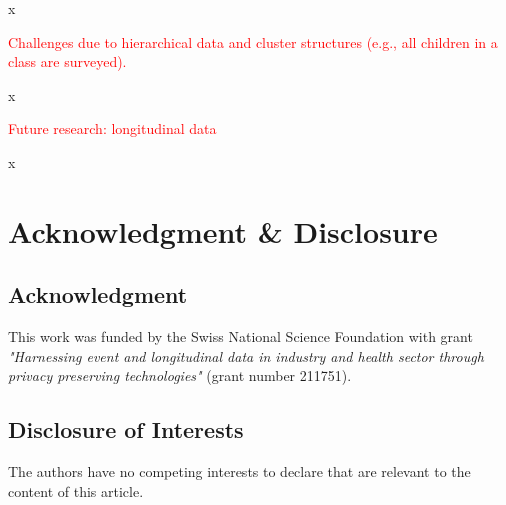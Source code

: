 \documentclass{article}
\begin{document}
x

\textcolor{red}{Challenges due to hierarchical data and cluster structures (e.g., all children in a class are surveyed).}

x

\textcolor{red}{Future research: longitudinal data}

x

\section*{Acknowledgment \& Disclosure} 
\subsection*{Acknowledgment} 
This work was funded by the Swiss National Science Foundation with grant \textit{"Harnessing event and longitudinal data in industry and health sector through privacy preserving technologies"} (grant number 211751).

\subsection*{Disclosure of Interests} 
The authors have no competing interests to declare that are relevant to the content of this article. 




\end{document}
